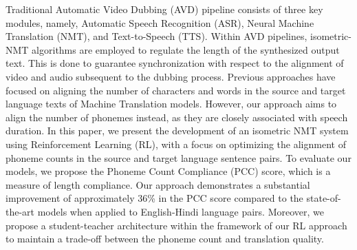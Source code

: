 Traditional Automatic Video Dubbing (AVD) pipeline consists of three key modules, namely, Automatic Speech Recognition (ASR), Neural Machine Translation (NMT), and Text-to-Speech (TTS). Within AVD pipelines, isometric-NMT algorithms are employed to regulate the length of the synthesized output text. This is done to guarantee synchronization with respect to the alignment of video and audio subsequent to the dubbing process. Previous approaches have focused on aligning the number of characters and words in the source and target language texts of Machine Translation models. However, our approach aims to align the number of phonemes instead, as they are closely associated with speech duration. In this paper, we present the development of an isometric NMT system using Reinforcement Learning (RL), with a focus on optimizing the alignment of phoneme counts in the source and target language sentence pairs. To evaluate our models, we propose the Phoneme Count Compliance (PCC) score,  which is a measure of length compliance. Our approach demonstrates a substantial improvement of approximately 36\% in the PCC score compared to the state-of-the-art models when applied to English-Hindi language pairs. Moreover, we propose a student-teacher architecture within the framework of our RL approach to maintain a trade-off between the phoneme count and translation quality.